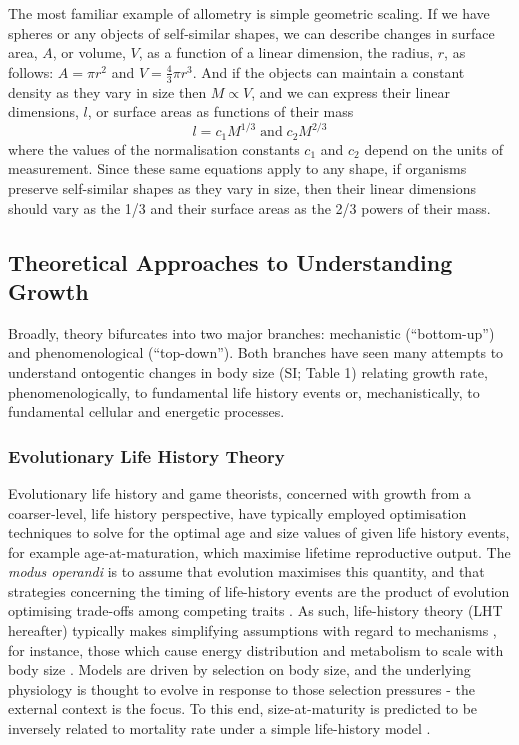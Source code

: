 \documentclass[a4paper]{article} %
\begin{document}
        The most familiar example of allometry is simple geometric scaling. If we have spheres or any objects of self-similar shapes, we can describe changes in surface area, $A$, or volume, $V$, as a function of a linear dimension, the radius, $r$, as follows: $A = \pi r^2$ and $V = \frac{4}{3}\pi r^3$. And if the objects can maintain a constant density as they vary in size then $M \propto V$, and we can express their linear dimensions, $l$, or surface areas as functions of their mass
        \begin{equation*}
            l = c_{1}M^{1/3} \; \text{and} \; c_{2}M^{2/3}
        \end{equation*}
        where the values of the normalisation constants $c_1$ and $c_2$ depend on the units of measurement. Since these same equations apply to any shape, if organisms preserve self-similar shapes as they vary in size, then their linear dimensions should vary as the 1/3 and their surface areas as the 2/3 powers of their mass.

        \subsection{Theoretical Approaches to Understanding Growth}
        Broadly, theory bifurcates into two major branches: mechanistic (``bottom-up'') and phenomenological (``top-down''). Both branches have seen many attempts to understand ontogentic changes in body size (SI; Table 1) relating growth rate, phenomenologically, to fundamental life history events or, mechanistically, to fundamental cellular and energetic processes.
        
        \subsubsection{Evolutionary Life History Theory}
        Evolutionary life history and game theorists, concerned with growth from a coarser-level, life history perspective, have typically employed optimisation techniques to solve for the optimal age and size values of given life history events, for example age-at-maturation, which maximise lifetime reproductive output. The \textit{modus operandi} is to assume that evolution maximises this quantity, and that strategies concerning the timing of life-history events are the product of evolution optimising trade-offs among competing traits \autocite{Day1997, Stearns1989, stearns1992evolution}. As such, life-history theory (LHT hereafter) typically makes simplifying assumptions with regard to mechanisms \autocite{Day1997, Kozowski1987-indeterminate}, for instance, those which cause energy distribution and metabolism to scale with body size \autocite{peters1983,Werner1988,brown2000-scaling-book}. Models are driven by selection on body size, and the underlying physiology is thought to evolve in response to those selection pressures - the external context is the focus. To this end, size-at-maturity is predicted to be inversely related to mortality rate under a simple life-history model \autocite{stearns1992evolution}.
        
\end{document}
